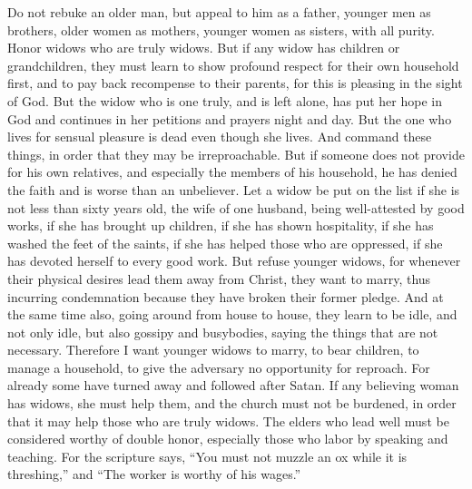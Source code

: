 \begin{biblechapter} %
 Do not rebuke an older man, but appeal to him as a father, younger men as brothers,
\verse older women as mothers, younger women as sisters, with all purity.
\verse Honor widows who are truly widows.
\verse But if any widow has children or grandchildren, they must learn to show profound respect for their own household first, and to pay back recompense to their parents, for this is pleasing in the sight of God.
\verse But the widow who is one truly, and is left alone, has put her hope in God and continues in her petitions and prayers night and day.
\verse But the one who lives for sensual pleasure is dead even though she lives.
\verse And command these things, in order that they may be irreproachable.
\verse But if someone does not provide for his own relatives, and especially the members of his household, he has denied the faith and is worse than an unbeliever.
\verse Let a widow be put on the list if she is not less than sixty years old, the wife of one husband,
\verse being well-attested by good works, if she has brought up children, if she has shown hospitality, if she has washed the feet of the saints, if she has helped those who are oppressed, if she has devoted herself to every good work.
\verse But refuse younger widows, for whenever their physical desires lead them away from Christ, they want to marry,
\verse thus incurring condemnation because they have broken their former pledge.
\verse And at the same time also, going around from house to house, they learn to be idle, and not only idle, but also gossipy and busybodies, saying the things that are not necessary.
\verse Therefore I want younger widows to marry, to bear children, to manage a household, to give the adversary no opportunity for reproach.
\verse For already some have turned away and followed after Satan.
\verse If any believing woman has widows, she must help them, and the church must not be burdened, in order that it may help those who are truly widows.
 The elders who lead well must be considered worthy of double honor, especially those who labor by speaking and teaching.
\verse For the scripture says, “You must not muzzle an ox while it is threshing,” and “The worker is worthy of his wages.”

\end{biblechapter}
